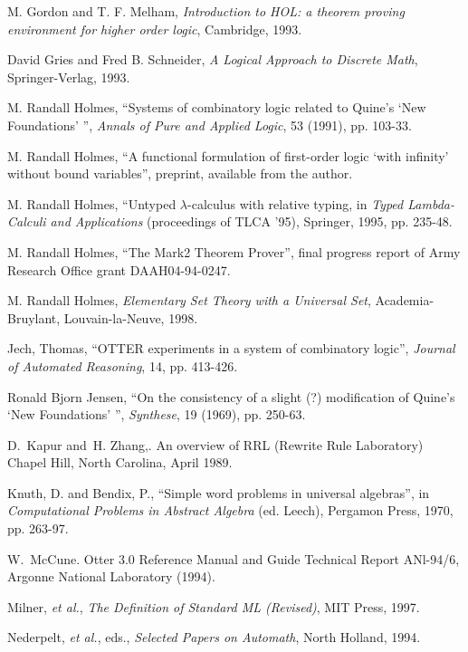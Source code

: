 \documentclass{kluwer}
\begin{document}
\begin{article}
\begin{thebibliography}{99}
 M. Gordon and T. F. Melham, {\em Introduction to HOL: a
theorem proving environment for higher order logic\/}, Cambridge,
1993.

 David Gries and Fred B. Schneider, {\em A Logical Approach to
Discrete Math\/}, Springer-Verlag, 1993.

 M. Randall Holmes, ``Systems of combinatory logic related to
Quine's `New Foundations' '', {\em Annals of Pure and Applied
Logic\/}, 53 (1991), pp. 103-33.

 M. Randall Holmes, ``A functional formulation of
first-order logic `with infinity' without bound variables'', preprint,
available from the author.

 M. Randall Holmes, ``Untyped $\lambda$-calculus with
relative typing, in {\em Typed Lambda-Calculi and Applications\/}
(proceedings of TLCA '95), Springer, 1995, pp. 235-48.

 M. Randall Holmes, ``The Mark2 Theorem Prover'',
final progress report of Army Research Office grant DAAH04-94-0247.

 M. Randall Holmes, {\em Elementary Set Theory with a
Universal Set\/}, Academia-Bruylant, Louvain-la-Neuve, 1998.

 Jech, Thomas, 
      ``OTTER experiments in a system of combinatory logic'',
      {\em Journal of Automated Reasoning\/}, 14, pp. 413-426. 

 Ronald Bjorn Jensen, ``On the consistency of a slight (?)
modification of Quine's `New Foundations' '', {\em Synthese\/}, 19
(1969), pp. 250-63.

D.~Kapur and~H. Zhang,.
\newblock An overview of RRL (Rewrite Rule Laboratory)
Chapel Hill, North Carolina, April 1989.

 Knuth, D. and Bendix, P., ``Simple word
problems in universal algebras'', in {\em Computational Problems in
Abstract Algebra\/} (ed. Leech), Pergamon Press, 1970, pp. 263-97.

W.~McCune.
\newblock Otter 3.0 Reference Manual and Guide
\newblock Technical Report ANl-94/6, Argonne National Laboratory (1994).

 Milner, {\em et al.}, {\em The Definition of Standard
ML (Revised)\/}, MIT Press, 1997.

 Nederpelt, {\em et al.\/}, eds., {\em
Selected Papers on Automath\/}, North Holland, 1994.


\end{thebibliography}
\end{article}
\end{document}

